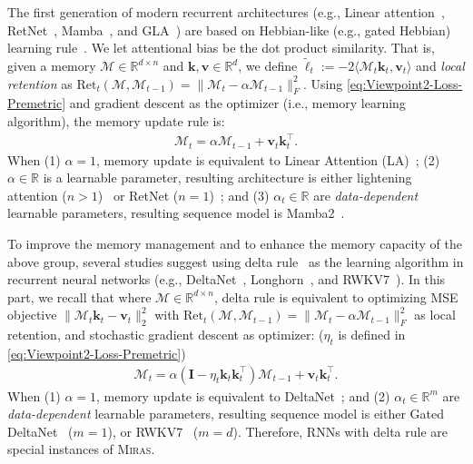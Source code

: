 \documentclass{article}
\newcommand{\citep}{\parencite}
\newcommand{\framework}[0]{\textsc{Miras}}
\newcommand{\R}[0]{\mathbb{R}}
\newcommand{\vk}[0]{\mathbf{k}}
\newcommand{\vvv}[0]{\mathbf{v}}
\newcommand{\inner}[2]{\langle #1, #2 \rangle}
\newcommand{\M}[0]{\mathcal{M}}
\theoremstyle{plain}
\theoremstyle{definition}
\theoremstyle{remark}
\newcommand{\head}[1]{\vspace{1.7mm}\noindent{{\textcolor{c2}{\bf #1.}}}}
\begin{document}
\head{RNNs with Hebbian Rule} The first generation of modern recurrent architectures (e.g., Linear attention~\citep{katharopoulos2020transformers}, RetNet~\citep{sun2023retentive}, Mamba~\citep{gu2024mamba}, and GLA~\citep{yang2024gatedattn}) are based on Hebbian-like (e.g., gated Hebbian) learning rule~\citep{hebb2005organization}. We let attentional bias be the dot product similarity. That is, given a memory $\M \in \R^{d \times n}$ and $\vk, \vvv \in \R^{d}$, we define $\tilde{\ell}_t := -2 \inner{\M_t \vk_t}{\vvv_t}$ and \emph{local retention} as $\text{Ret}_t(\M, \M_{t-1}) = \| \M_t - \alpha \M_{t-1} \|_F^2$. Using \autoref{eq:Viewpoint2-Loss-Premetric} and gradient descent as the optimizer (i.e., memory learning algorithm), the memory update rule is:
\begin{align}
    \M_t = \alpha \M_{t-1} + \vvv_t \vk_t^{\top}.
\end{align}
When (1) $\alpha = 1$, memory update is equivalent to Linear Attention (LA)~\citep{katharopoulos2020transformers}; (2) $\alpha \in \R$ is a learnable parameter, resulting architecture is either lightening attention ($n > 1$)~\citep{li2025minimax} or RetNet ($n = 1$)~\citep{sun2023retentive}; and (3) $\alpha_t \in \R$ are \emph{data-dependent} learnable parameters, resulting sequence model is Mamba2~\citep{dao2024transformers}. 


\head{RNNs with Delta Rule} To improve the memory management and to enhance the memory capacity of the above group, several studies suggest using delta rule~\citep{neil2017delta, schlag2021linear} as the learning algorithm in recurrent neural networks (e.g., DeltaNet~\citep{schlag2021linear}, Longhorn~\citep{liu2024longhorn}, and RWKV7~\citep{peng2025rwkv7}). In this part, we recall that where $\M \in \R^{d \times n}$, delta rule is equivalent to optimizing MSE objective $\|\M_t \vk_t - \vvv_t\|^2_2$ with $\text{Ret}_t(\M, \M_{t-1}) = \| \M_t - \alpha \M_{t-1} \|_F^2$ as local retention, and stochastic gradient descent as optimizer: ($\eta_t$ is defined in \autoref{eq:Viewpoint2-Loss-Premetric})
\begin{align}
    \M_t = \alpha \left( \mathbf{I} - \eta_t \vk_t \vk_t^{\top}\right) \M_{t-1} + \vvv_t \vk_t^{\top}.
\end{align}
When (1) $\alpha = 1$, memory update is equivalent to DeltaNet~\citep{schlag2021linear}; and (2) $\alpha_t \in \R^m$ are \emph{data-dependent} learnable parameters, resulting sequence model is either Gated DeltaNet~\citep{yang2024gated} ($m = 1$), or RWKV7~\citep{peng2025rwkv7} ($m = d$).  
Therefore, RNNs with delta rule are special instances of \framework. 
\end{document}
